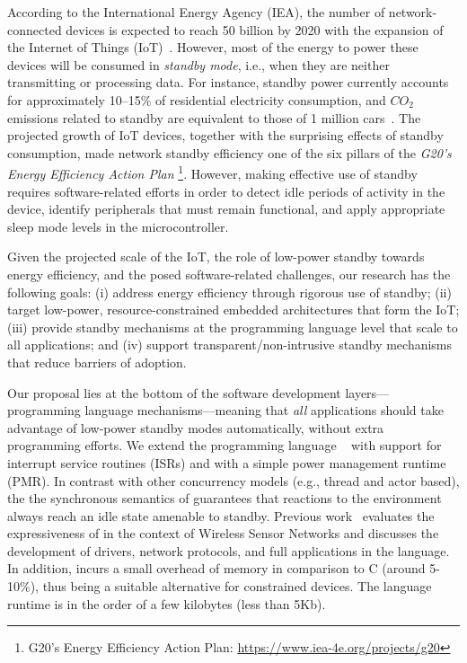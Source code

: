 \label{sec.introduction}

According to the International Energy Agency (IEA), the number of
network-connected devices is expected to reach 50 billion by 2020 with the
expansion of the Internet of Things (IoT)~\cite{iea.data}.
%
However, most of the energy to power these devices will be consumed in
\emph{standby mode}, i.e., when they are neither transmitting or processing
data.
%
For instance, standby power currently accounts for approximately 10--15\% of
residential electricity consumption, and $CO_2$ emissions related to standby
are equivalent to those of 1 million cars~\cite{iea.data,standby.australia}.
%
The projected growth of IoT devices, together with the surprising effects of
standby consumption, made network standby efficiency one of the six
pillars of the \emph{G20's Energy Efficiency Action Plan}%
\footnote{G20's Energy Efficiency Action Plan: \url{https://www.iea-4e.org/projects/g20}}.
%
However, making effective use of standby requires software-related efforts in
order to detect idle periods of activity in the device, identify peripherals
that must remain functional, and apply appropriate sleep mode levels in the
microcontroller.

Given the projected scale of the IoT, the role of low-power standby towards
energy efficiency, and the posed software-related challenges, our research has
the following goals:
%
(i)   address energy efficiency through rigorous use of standby;
(ii)  target low-power, resource-constrained embedded architectures that form
      the IoT;
(iii) provide standby mechanisms at the programming language level that scale
      to all applications; and
(iv)  support transparent/non-intrusive standby mechanisms that reduce barriers
      of adoption.

Our proposal lies at the bottom of the software development
layers---programming language mechanisms---meaning that \emph{all} applications
should take advantage of low-power standby modes automatically, without extra
programming efforts.
%
We extend the programming language \CEU~\cite{ceu.sensys13,ceu.tecs17} with
support for interrupt service routines (ISRs) and with a simple power
management runtime (PMR).
%
In contrast with other concurrency models (e.g., thread and actor based), the
the synchronous semantics of \CEU guarantees that reactions to the environment
always reach an idle state amenable to standby.
%
Previous work~\cite{ceu.sensys13} evaluates the expressiveness of \CEU in the
context of Wireless Sensor Networks and discusses the development of drivers,
network protocols, and full applications in the language.
In addition, \CEU incurs a small overhead of memory in comparison to C (around
5-10\%), thus being a suitable alternative for constrained devices.
The language runtime is in the order of a few kilobytes (less than 5Kb).

